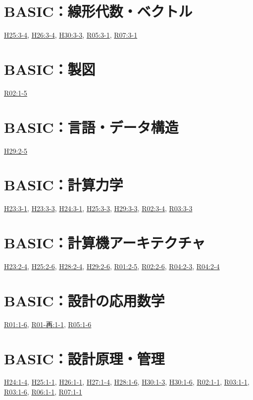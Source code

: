 \section{BASIC：線形代数・ベクトル}
\hyperref[q:h25-reg-basic-3-4]{H25:3-4}, \hyperref[q:h26-reg-basic-3-4]{H26:3-4}, \hyperref[q:h30-reg-basic-3-3]{H30:3-3}, \hyperref[q:r05-reg-basic-3-1]{R05:3-1}, \hyperref[q:r07-reg-basic-3-1]{R07:3-1}
\section{BASIC：製図}
\hyperref[q:r02-reg-basic-1-5]{R02:1-5}
\section{BASIC：言語・データ構造}
\hyperref[q:h29-reg-basic-2-5]{H29:2-5}
\section{BASIC：計算力学}
\hyperref[q:h23-reg-basic-3-1]{H23:3-1}, \hyperref[q:h23-reg-basic-3-3]{H23:3-3}, \hyperref[q:h24-reg-basic-3-1]{H24:3-1}, \hyperref[q:h25-reg-basic-3-3]{H25:3-3}, \hyperref[q:h29-reg-basic-3-3]{H29:3-3}, \hyperref[q:r02-reg-basic-3-4]{R02:3-4}, \hyperref[q:r03-reg-basic-3-3]{R03:3-3}
\section{BASIC：計算機アーキテクチャ}
\hyperref[q:h23-reg-basic-2-4]{H23:2-4}, \hyperref[q:h25-reg-basic-2-6]{H25:2-6}, \hyperref[q:h28-reg-basic-2-4]{H28:2-4}, \hyperref[q:h29-reg-basic-2-6]{H29:2-6}, \hyperref[q:r01-reg-basic-2-5]{R01:2-5}, \hyperref[q:r02-reg-basic-2-6]{R02:2-6}, \hyperref[q:r04-reg-basic-2-3]{R04:2-3}, \hyperref[q:r04-reg-basic-2-4]{R04:2-4}
\section{BASIC：設計の応用数学}
\hyperref[q:r01-reg-basic-1-6]{R01:1-6}, \hyperref[q:r01-ret-basic-1-1]{R01-再:1-1}, \hyperref[q:r05-reg-basic-1-6]{R05:1-6}
\section{BASIC：設計原理・管理}
\hyperref[q:h24-reg-basic-1-4]{H24:1-4}, \hyperref[q:h25-reg-basic-1-1]{H25:1-1}, \hyperref[q:h26-reg-basic-1-1]{H26:1-1}, \hyperref[q:h27-reg-basic-1-4]{H27:1-4}, \hyperref[q:h28-reg-basic-1-6]{H28:1-6}, \hyperref[q:h30-reg-basic-1-3]{H30:1-3}, \hyperref[q:h30-reg-basic-1-6]{H30:1-6}, \hyperref[q:r02-reg-basic-1-1]{R02:1-1}, \hyperref[q:r03-reg-basic-1-1]{R03:1-1}, \hyperref[q:r03-reg-basic-1-6]{R03:1-6}, \hyperref[q:r06-reg-basic-1-1]{R06:1-1}, \hyperref[q:r07-reg-basic-1-1]{R07:1-1}
